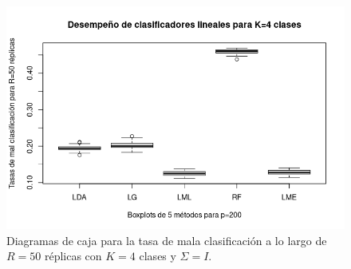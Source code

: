 \documentclass{report}
\begin{document}
\begin{figure} [h]
\begin{multicols}{2}
  		\caption*{$p=100$}
  		\includegraphics[width=\linewidth]{4_clases_p200_sigma_I}\par 
  		\caption*{$p=200$}
  		
  	\end{multicols}
  	\caption{ Diagramas de caja para la tasa de mala clasificación  a lo largo de $R=50$ réplicas con $K=4$ clases y $\Sigma=I$. }
  	\label{boxk4sigmaiden}
  \end{figure}
  
  
  
\end{document}
